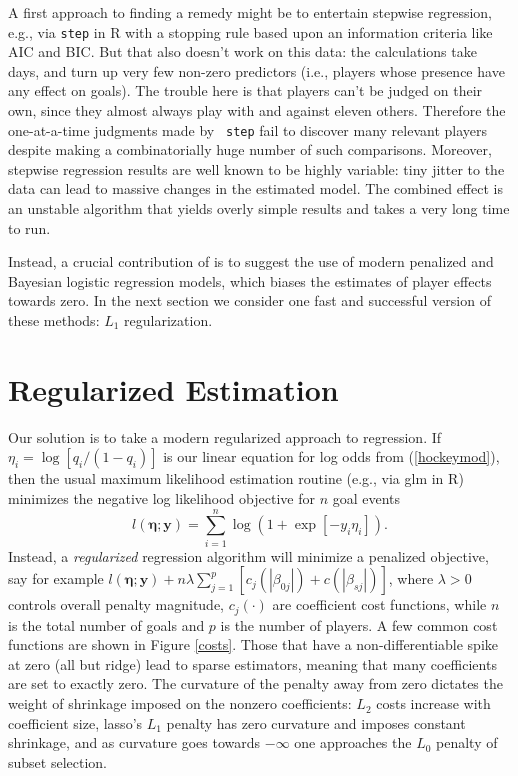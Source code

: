 A first approach to finding a remedy might be to entertain stepwise
regression, e.g., via {\tt step} in {\sf R} with a stopping rule based upon an
information criteria like AIC and BIC.  But that also doesn't work on this
data: the calculations take days, and turn up very few non-zero predictors
(i.e., players whose presence have any effect on goals).  The trouble here is
that players  can't be judged on their own, since they almost always play with
and against eleven others.  Therefore the one-at-a-time judgments made by {\tt
step} fail to discover many relevant players despite making a combinatorially
huge number of such comparisons.  Moreover, stepwise regression results are
well known to be highly variable: tiny jitter to the data can lead to massive
changes in the estimated model. The combined effect is an unstable algorithm
that yields overly simple results and takes a very long time to run.

Instead, a crucial contribution of
\cite{gramacy:jensen:taddy:2013} is to suggest the use of modern penalized and
Bayesian logistic regression models, which biases the estimates of player
effects towards zero. In the next section we consider one fast and successful
version of these methods: $L_1$ regularization.

\section{Regularized Estimation}
\label{sec:regularization}

Our solution is to take a modern regularized approach to regression.  If
$\eta_i = \log[ q_i/(1-q_i) ]$ is our linear equation for log odds from
(\ref{hockeymod}), then the usual maximum likelihood estimation routine (e.g.,
via {\sf glm} in {\sf R}) minimizes the negative log likelihood objective
for $n$ goal events
\begin{equation}
\label{eq:nllhd} l\left(\boldsymbol{\eta}; \mathbf{y}\right) =
\sum_{i=1}^n \log\left(1 + \exp[-y_i \eta_i]\right). 
\end{equation} 
Instead, a
\textit{regularized} regression algorithm will minimize a penalized objective,
say for example $l\left(\boldsymbol{\eta}; \mathbf{y}\right) + n\lambda
\sum_{j=1}^p\left[ c_j\left(|\beta_{0j}|\right) +
c\left(|\beta_{sj}|\right)\right]$, where $\lambda>0$ controls overall penalty
magnitude, $c_j(\cdot)$ are coefficient cost functions, while $n$ is the total
number of goals and $p$ is the number of players.
A few common cost functions are shown in Figure \ref{costs}.  Those that have
a non-differentiable spike at zero (all but ridge) lead to sparse estimators,
meaning that many coefficients are set to exactly zero.   The curvature of the penalty
away from zero dictates the weight of shrinkage imposed on the nonzero
coefficients:  $L_2$ costs increase with coefficient size,  lasso's $L_1$
penalty has zero curvature and imposes constant shrinkage, and as curvature
goes towards $-\infty$ one approaches the $L_0$ penalty of subset selection.

